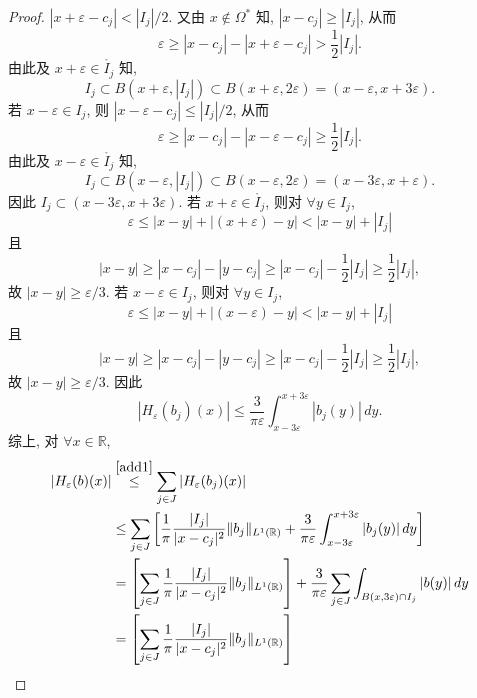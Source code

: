 \documentclass[a4paper,11pt]{article}
\theoremstyle{definition}
\begin{document}
\begin{proof}
    $ |x + \varepsilon - c_j| < |I_j| / 2 $.
    又由 $ x \notin \Omega^* $ 知, $ |x - c_j| \geq |I_j| $, 从而
    $$
        \varepsilon \geq |x - c_j| - |x + \varepsilon - c_j| > \frac{1}{2} |I_j|.
    $$
    由此及 $ x + \varepsilon \in \mathring{I_j} $ 知,
    $$ 
        I_j \subset B(x + \varepsilon, |I_j|) 
            \subset B(x + \varepsilon, 2 \varepsilon) 
            = (x - \varepsilon, x + 3 \varepsilon). 
    $$
    若 $ x - \varepsilon \in I_j $, 则
    $ |x - \varepsilon - c_j| \leq |I_j| / 2 $, 从而
    $$
        \varepsilon \geq |x - c_j| - |x - \varepsilon - c_j| \geq \frac{1}{2} |I_j|.
    $$
    由此及 $ x - \varepsilon \in \mathring{I_j} $ 知,
    $$ 
        I_j \subset B(x - \varepsilon, |I_j|) 
            \subset B(x - \varepsilon, 2 \varepsilon) 
            = (x - 3 \varepsilon, x + \varepsilon). 
    $$
    因此 $ I_j \subset (x - 3\varepsilon, x + 3\varepsilon) $. 
    若 $ x + \varepsilon \in \mathring{I_j} $, 则对 $ \forall y \in I_j $, 
    $$
        \varepsilon 
            \leq |x - y| + | (x + \varepsilon) - y | 
            < |x - y| + |I_j|
    $$
    且
    $$
        |x - y| \geq |x - c_j| - |y - c_j| \geq |x - c_j| - \frac{1}{2} |I_j| \geq \frac{1}{2} |I_j|,
    $$
    故 $ |x - y| \geq \varepsilon / 3 $. 
    若 $ x - \varepsilon \in I_j $, 则对 $ \forall y \in I_j $, 
    $$
        \varepsilon 
            \leq |x - y| + | (x - \varepsilon) - y | 
            < |x - y| + |I_j|
    $$
    且
    $$
        |x - y| \geq |x - c_j| - |y - c_j| \geq |x - c_j| - \frac{1}{2} |I_j| \geq \frac{1}{2} |I_j|,
    $$
    故 $ |x - y| \geq \varepsilon / 3 $.  
    因此
    $$
        |H_\varepsilon (b_j) (x)|
            \leq \frac{3}{\pi\varepsilon} \int_{x - 3\varepsilon}^{x + 3\varepsilon}  |b_j(y)| \, dy.
    $$
    综上, 对 $ \forall x \in \mathbb{R} $,
    \begin{align} \label{end1}
        |H_\varepsilon (b) (x)| 
            &\overset{\eqref{add1}}{\leq} \sum_{j \in J}  |H_\varepsilon (b_j)(x)|  \\
            &\leq \sum_{j \in J} \left[ \frac{1}{\pi} \frac{|I_j|}{|x - c_j|^2} \|b_j\|_{L^1(\mathbb{R})}
                + \frac{3}{\pi\varepsilon} \int_{x - 3\varepsilon}^{x + 3\varepsilon}  |b_j(y)| \, dy \right] \notag\\
            &= \left[ \sum_{j \in J} \frac{1}{\pi} \frac{|I_j|}{|x - c_j|^2} \|b_j\|_{L^1(\mathbb{R})} \right]
                + \frac{3}{\pi\varepsilon} \sum_{j \in J} \int_{B(x, 3\varepsilon) \cap I_j}  |b(y)| \, dy \notag\\
            &= \left[ \sum_{j \in J} \frac{1}{\pi} \frac{|I_j|}{|x - c_j|^2} \|b_j\|_{L^1(\mathbb{R})} \right]

\end{align}
\end{proof}
\end{document}
